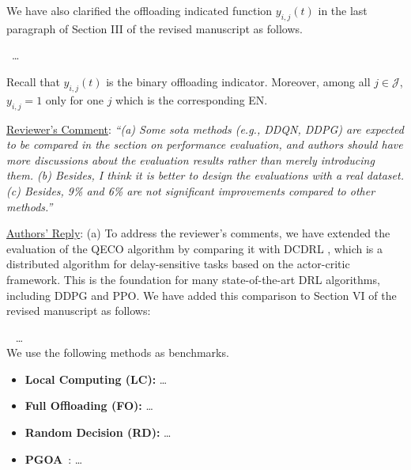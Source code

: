 \documentclass[12pt,draftclsnofoot,onecolumn]{IEEEtran}
\newcommand{\rev}[1]{{\color{blue}#1}} %
\newcommand{\rev}[1]{#1}
\newenvironment{my}[2]%
{\begin{list}{}%
{\setlength{\rightmargin}{#1}\setlength{\leftmargin}{#2}}%


 \item[]{}

} {\end{list}}
\begin{document}
\begin{enumerate}
We have also clarified the offloading indicated function $y_{i,j}(t)$ in the last paragraph of Section III of the revised manuscript as follows.
		\begin{my}{1cm}{1cm}
	\rev{
		{\ 
\dots 

Recall that $y_{i,j}(t)$ is the binary offloading indicator. Moreover, among all $j \in \mathcal{J}$, $y_{i,j}=1$ only for one $j$ which is the corresponding EN.
}}
\end{my}\vspace{5mm}


\item \underline{Reviewer's Comment}: 
\textit{``(a) Some sota methods (e.g., DDQN, DDPG) are expected to be compared in the section on performance evaluation, and authors should have more discussions about the evaluation results rather than merely introducing them.  (b) Besides, I think it is better to design the evaluations with a real dataset. (c) Besides, 9\% and 6\% are not significant improvements compared to other methods.''}\newline


\underline{Authors' Reply}: (a) To address the reviewer's comments, we have extended the evaluation of the QECO algorithm by comparing it with DCDRL \cite{qiu2020distributed}, which is a distributed algorithm for delay-sensitive tasks based on the actor-critic framework. This is the foundation for many state-of-the-art DRL algorithms, including DDPG and PPO. 
We have added this comparison to Section VI of the revised manuscript as follows: 
		\begin{my}{1cm}{1cm}
	\rev{
		{\
			\color{black}
\hspace{-10mm}  \dots \\ We use the following methods as benchmarks.
\begin{itemize}
	
	\item \textbf{Local Computing (LC):} \dots\vspace{1mm}
	
	\item \textbf{Full Offloading (FO):} \dots\vspace{1mm}
	
	\item \textbf{Random Decision (RD):} \dots\vspace{1mm}
	
	\item \textbf{PGOA}~\cite{yang2018distributed}: \dots\vspace{1mm}
	

\end{itemize}}}
\end{my}
\end{enumerate}
\end{document}
